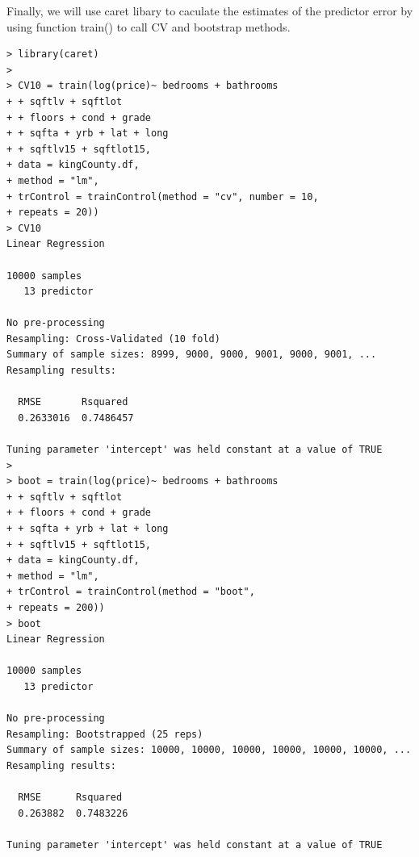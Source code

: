 \documentclass{article}%
\begin{document}
Finally, we will use caret libary to caculate the estimates of the predictor error by using function train() to call CV and bootstrap methods.
\begin{verbatim}
> library(caret)
> 
> CV10 = train(log(price)~ bedrooms + bathrooms
+ + sqftlv + sqftlot
+ + floors + cond + grade 
+ + sqfta + yrb + lat + long
+ + sqftlv15 + sqftlot15,
+ data = kingCounty.df,
+ method = "lm",
+ trControl = trainControl(method = "cv", number = 10, 
+ repeats = 20))
> CV10
Linear Regression 

10000 samples
   13 predictor

No pre-processing
Resampling: Cross-Validated (10 fold) 
Summary of sample sizes: 8999, 9000, 9000, 9001, 9000, 9001, ... 
Resampling results:

  RMSE       Rsquared 
  0.2633016  0.7486457

Tuning parameter 'intercept' was held constant at a value of TRUE
> 
> boot = train(log(price)~ bedrooms + bathrooms
+ + sqftlv + sqftlot
+ + floors + cond + grade 
+ + sqfta + yrb + lat + long
+ + sqftlv15 + sqftlot15,
+ data = kingCounty.df,
+ method = "lm",
+ trControl = trainControl(method = "boot", 
+ repeats = 200))
> boot
Linear Regression 

10000 samples
   13 predictor

No pre-processing
Resampling: Bootstrapped (25 reps) 
Summary of sample sizes: 10000, 10000, 10000, 10000, 10000, 10000, ... 
Resampling results:

  RMSE      Rsquared 
  0.263882  0.7483226

Tuning parameter 'intercept' was held constant at a value of TRUE
\end{verbatim}
\end{document}
